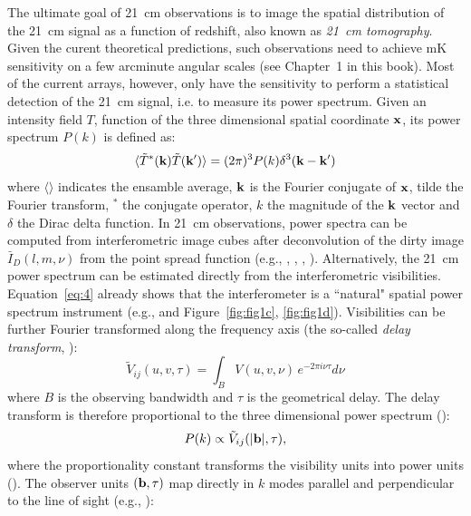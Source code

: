 The ultimate goal of 21~cm observations is to image the spatial distribution of the 21~cm signal as a function of redshift, also known as {\it 21~cm tomography}. Given the curent theoretical predictions, such observations need to achieve mK sensitivity on a few arcminute angular scales (see Chapter~1 in this book). Most of the current arrays, however, only have the sensitivity to perform a statistical detection of the 21~cm signal, i.e. to measure its power spectrum. Given an intensity field $T$, function of the three dimensional spatial coordinate $\bf x$, its power spectrum $P(k)$ is defined as:
\begin{equation}
\langle {\tilde T}^* ({\bf k}) {\tilde T}({\bf k'}) \rangle = (2 \pi)^3 P(k) \delta^3({\bf k} - {\bf k}')
\label{sec_observables_eq1}
\end{equation}
where $\langle \rangle$ indicates the ensamble average, $\bf k$ is the Fourier conjugate of $\bf x$, tilde the Fourier transform, $^*$ the conjugate operator, $k$ the magnitude of the $\bf k$ vector and $\delta$ the Dirac delta function. In 21~cm observations, power spectra can be computed from interferometric image cubes after deconvolution of the dirty image ${\bar I}_D (l,m,\nu)$ from the point spread function (e.g., \cite{pen09}, \cite{harker10}, \cite{beardsley16}, \cite{patil17}). Alternatively, the 21~cm power spectrum can be estimated directly from the interferometric visibilities. Equation~\ref{eq:4} already shows that the interferometer is a ``natural" spatial power spectrum instrument (e.g., \cite{white99} and Figure~\ref{fig:fig1c}, \ref{fig:fig1d}). Visibilities can be further Fourier transformed along the frequency axis (the so-called {\it delay transform}, \cite{parsons12a}): 
\begin{equation}
{\tilde V}_{ij} (u,v, \tau) = \int_B V (u,v, \nu) \, e^{-2 \pi i \nu \tau} d \nu
\label{sec_observables_eq2}
\end{equation}
where $B$ is the observing bandwidth and $\tau$ is the geometrical delay. The delay transform is therefore proportional to the three dimensional power spectrum (\cite{parsons12b}):
\begin{equation}
P(k) \propto {\tilde V}_{ij} (|{\bf b}|, \tau),
\label{sec_observables_eq3}
\end{equation}
where the proportionality constant transforms the visibility units into power units (\cite{parsons12b}). The observer units $({\bf b},\tau)$ map directly in $k$ modes parallel and perpendicular to the line of sight (e.g., \cite{morales04}):
